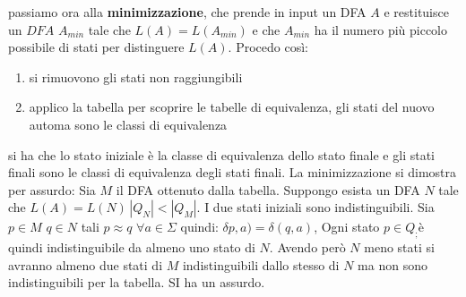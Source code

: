passiamo ora alla \textbf{minimizzazione}, che prende in input un DFA $A$ e restituisce un $DFA$ $A_{min}$ tale che $L(A)=L(A_{min})$ e che $A_{min}$ ha il numero più piccolo possibile di stati per distinguere $L(A)$.
Procedo così:
\begin{enumerate}
\item si rimuovono gli stati non raggiungibili
\item applico la tabella per scoprire le tabelle di equivalenza, gli stati del nuovo automa sono le classi di equivalenza
\end{enumerate}
si ha che lo stato iniziale è la classe di equivalenza dello stato finale e gli stati finali sono le classi di equivalenza degli stati finali.
La minimizzazione si dimostra per assurdo:
Sia $M$ il DFA ottenuto dalla tabella. Suppongo esista un DFA $N$ tale che $L(A)=L(N)\,|Q_N|<|Q_M|$. I due stati iniziali sono indistinguibili. Sia $p\in M\,\,q\in N$ tali $p\approx q\,\, \forall a\in\Sigma$ quindi: $\delta p,a)=\delta(q,a)$, Ogni stato $p\in Q_;$è quindi indistinguibile da almeno uno stato di $N$. Avendo però $N$ meno stati si avranno almeno due stati di $M$ indistinguibili dallo stesso di $N$ ma non sono indistinguibili per la tabella. SI ha un assurdo.

